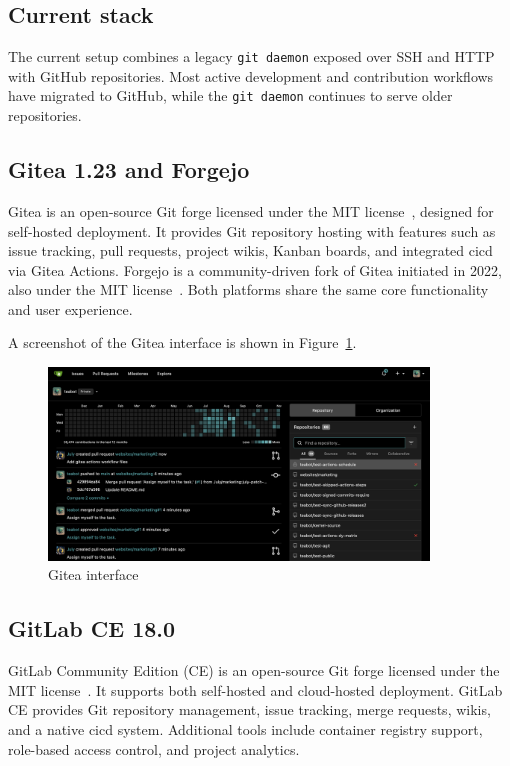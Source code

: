 \subsection*{Current stack}
The current setup combines a legacy \verb|git daemon| exposed over SSH and HTTP with GitHub repositories. Most active development and contribution workflows have migrated to GitHub, while the \texttt{git daemon} continues to serve older repositories.

\subsection*{Gitea 1.23 and Forgejo}

Gitea is an open-source Git forge licensed under the MIT license~\cite{gitea-docs}, designed for self-hosted deployment. It provides Git repository hosting with features such as issue tracking, pull requests, project wikis, Kanban boards, and integrated \gls{cicd} via Gitea Actions. Forgejo is a community-driven fork of Gitea initiated in 2022, also under the MIT license~\cite{forgejo-docs}. Both platforms share the same core functionality and user experience.

A screenshot of the Gitea interface is shown in Figure~\ref{fig:gitea-ui}.

\begin{figure}[H]
  \centering
  \includegraphics[width=0.9\textwidth]{imaxes/gitea-ui.png}
  \caption{Gitea interface}
  \label{fig:gitea-ui}
\end{figure}

\subsection*{GitLab CE 18.0}

GitLab Community Edition (CE) is an open-source Git forge licensed under the MIT license~\cite{gitlab-docs}. It supports both self-hosted and cloud-hosted deployment. GitLab CE provides Git repository management, issue tracking, merge requests, wikis, and a native \gls{cicd} system. Additional tools include container registry support, role-based access control, and project analytics.

